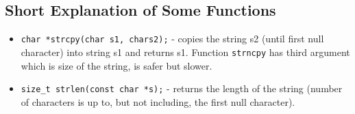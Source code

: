 \documentclass[openany]{book}
\begin{document}
    \subsection*{Short Explanation of Some Functions}
    \begin{itemize}
        \item \texttt{char *strcpy(char s1, chars2);} - copies the string s2 (until first null character) into string s1 and
        returns s1. Function \texttt{strncpy} has third argument which is size of the string, is safer but slower.
        \item \texttt{size\_t strlen(const char *s);} - returns the length of the string (number of characters is up to,
        but not including, the first null character).
    \end{itemize}
\end{document}
